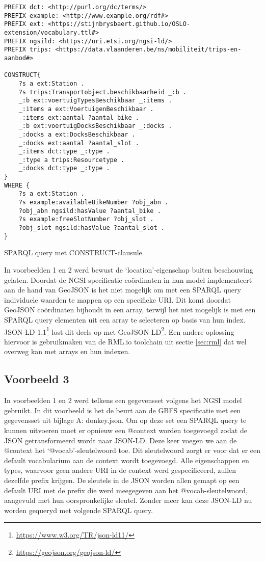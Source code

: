 \begin{code}
\begin{verbatim}
PREFIX dct: <http://purl.org/dc/terms/>
PREFIX example: <http://www.example.org/rdf#>
PREFIX ext: <https://stijnbrysbaert.github.io/OSLO-extension/vocabulary.ttl#>
PREFIX ngsild: <https://uri.etsi.org/ngsi-ld/>
PREFIX trips: <https://data.vlaanderen.be/ns/mobiliteit/trips-en-aanbod#>

CONSTRUCT{
    ?s a ext:Station .
    ?s trips:Transportobject.beschikbaarheid _:b .
    _:b ext:voertuigTypesBeschikbaar _:items .
    _:items a ext:VoertuigenBeschikbaar .
    _:items ext:aantal ?aantal_bike .
    _:b ext:voertuigDocksBeschikbaar _:docks .
    _:docks a ext:DocksBeschikbaar .
    _:docks ext:aantal ?aantal_slot .
    _:items dct:type _:type .
    _:type a trips:Resourcetype .
    _:docks dct:type _:type .
}
WHERE {
    ?s a ext:Station .
    ?s example:availableBikeNumber ?obj_abn .
    ?obj_abn ngsild:hasValue ?aantal_bike .
    ?s example:freeSlotNumber ?obj_slot .
    ?obj_slot ngsild:hasValue ?aantal_slot .
}
\end{verbatim}
\caption{SPARQL query met CONSTRUCT-clausule}
\label{code:construct}
\end{code}

In voorbeelden 1 en 2 werd bewust de `location'-eigenschap buiten beschouwing gelaten. Doordat de NGSI specificatie coördinaten in hun model implementeert aan de hand van GeoJSON is het niet mogelijk om met een SPARQL query individuele waarden te mappen op een specifieke URI. Dit komt doordat GeoJSON coördinaten bijhoudt in een array, terwijl het niet mogelijk is met een SPARQL query elementen uit een array te selecteren op basis van hun index. JSON-LD 1.1\footnote{\url{https://www.w3.org/TR/json-ld11/}} lost dit deels op met GeoJSON-LD\footnote{\url{https://geojson.org/geojson-ld/}}.
Een andere oplossing hiervoor is gebruikmaken van de RML.io toolchain uit sectie \ref{sec:rml} dat wel overweg kan met arrays en hun indexen.

\subsection{Voorbeeld 3}
\label{subsec:vb3}
In voorbeelden 1 en 2 werd telkens een gegevensset volgens het NGSI model gebruikt. In dit voorbeeld is het de beurt aan de GBFS specificatie met een gegevensset uit bijlage A: donkey.json. Om op deze set een SPARQL query te kunnen uitvoeren moet er opnieuw een @context worden toegevoegd zodat de JSON getransformeerd wordt naar JSON-LD. 
Deze keer voegen we aan de @context het `@vocab'-sleutelwoord toe. Dit sleutelwoord zorgt er voor dat er een default vocabularium aan de context wordt toegevoegd. Alle eigenschappen en types, waarvoor geen andere URI in de context werd gespecificeerd, zullen dezelfde prefix krijgen.
De sleutels in de JSON worden allen gemapt op een default URI met de prefix die werd meegegeven aan het @vocab-sleutelwoord, aangevuld met hun oorspronkelijke sleutel. Zonder meer kan deze JSON-LD nu worden gequeryd met volgende SPARQL query.

